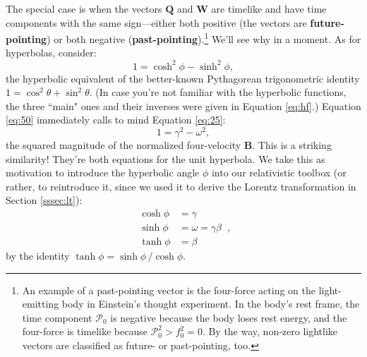 \documentclass[12pt]{article}
\renewcommand{\vv}[1]{\mathbf{#1}}
\begin{document}
The special case is when the vectors $\vv Q$ and $\vv W$ are timelike and have time components with the same sign---either both positive (the vectors are \textbf{future-pointing}) or both negative (\textbf{past-pointing}).\footnote{\label{fn:nt}An example of a past-pointing vector is the four-force acting on the light-emitting body in Einstein's thought experiment. In the body's rest frame, the time component $\mathcal{P}_0$ is negative because the body loses rest energy, and the four-force is timelike because $\mathcal{P}_0^2 > f_0^2 = 0$. By the way, non-zero lightlike vectors are classified as future- or past-pointing, too.} We'll see why in a moment. As for hyperbolas, consider:
\begin{equation}\label{eq:50}
1 = \cosh^2 {\phi} - \sinh^2 {\phi},
\end{equation}
the hyperbolic equivalent of the better-known Pythagorean trigonometric identity $1 = \cos^2 {\theta} + \sin^2 {\theta}$. (In case you're not familiar with the hyperbolic functions, the three ``main" ones and their inverses were given in Equation \ref{eq:hf}.) Equation \ref{eq:50} immediately calls to mind Equation \ref{eq:25}:
\begin{equation*}
1 = \gamma^2 - \omega^2 ,
\end{equation*}
the squared magnitude of the normalized four-velocity $\vv B$. This is a striking similarity! They're both equations for the unit hyperbola. We take this as motivation to introduce the hyperbolic angle $\phi$ into our relativistic toolbox (or rather, to reintroduce it, since we used it to derive the Lorentz transformation in Section \ref{sssec:lt}):
\begin{equation}\label{eq:51}
\boxed{
\begin{aligned}
\cosh{\phi} &= \gamma \\
\sinh{\phi} &= \omega = \gamma \beta \\
\tanh{\phi} &= \beta
\end{aligned}
} \, ,
\end{equation}
by the identity $\tanh{\phi} = \sinh{\phi} \, / \cosh{\phi}$.
\end{document}
